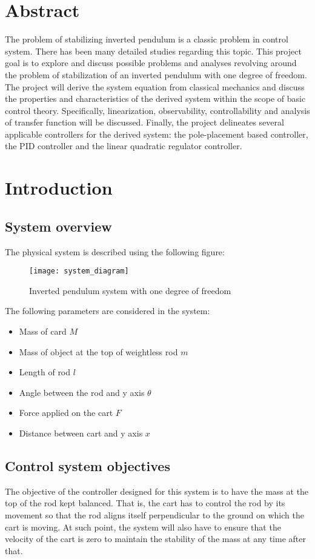 \documentclass [12pt,letterpaper]{exam}
\begin{document}
\noindent
\section{Abstract}
The problem of stabilizing inverted pendulum is a classic problem in control system. There has been many detailed studies regarding this topic. This project goal is to explore and discuss possible problems and analyses revolving around the problem of stabilization of an inverted pendulum with one degree of freedom. The project will derive the system equation from classical mechanics and discuss the properties and characteristics of the derived system within the scope of basic control theory. Specifically, linearization, observability, controllability and analysis of transfer function will be discussed. Finally, the project delineates several applicable controllers for the derived system: the pole-placement based controller, the PID controller and the linear quadratic regulator controller.
\newpage

\section{Introduction}
\subsection{System overview}
The physical system is described using the following figure:
\begin{figure}[h]
  \centering
    \texttt{[image: system\_diagram]} 
  \caption{Inverted pendulum system with one degree of freedom}
  \label{fig:system_diagram}
\end{figure}

The following parameters are considered in the system:
\begin{itemize}
    \item Mass of card $M$
    \item Mass of object at the top of weightless rod $m$
    \item Length of rod $l$
    \item Angle between the rod and y axis $\theta$
    \item Force applied on the cart $F$
    \item Distance between cart and y axis $x$
\end{itemize}

\subsection{Control system objectives}
The objective of the controller designed for this system is to have the mass at the top of the rod kept balanced. That is, the cart has to control the rod by its movement so that the rod aligns itself perpendicular to the ground on which the cart is moving. At such point, the system will also have to ensure that the velocity of the cart is zero to maintain the stability of the mass at any time after that.
\end{document}
